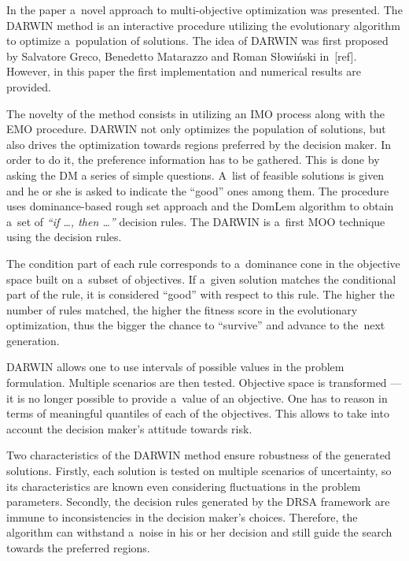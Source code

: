 In the paper a~novel approach to multi-objective optimization was
presented. The DARWIN method is an interactive procedure utilizing the
evolutionary algorithm to optimize a~population of solutions. The idea of
DARWIN was first proposed by Salvatore Greco, Benedetto Matarazzo and Roman
Słowiński in~[ref]. However, in this paper the first implementation and
numerical results are provided.

The novelty of the method consists in utilizing an IMO process along with the
EMO procedure. DARWIN not only optimizes the population of solutions, but also
drives the optimization towards regions preferred by the decision maker. In
order to do it, the preference information has to be gathered. This is done by
asking the DM a series of simple questions. A~list of feasible solutions is
given and he or she is asked to indicate the ``good'' ones among them. The
procedure uses dominance-based rough set approach and the DomLem algorithm to
obtain a~set of \textit{``if \dots, then \dots''} decision rules. The DARWIN
is a~first MOO technique using the decision rules.

The condition part of each rule corresponds to a~dominance cone in the
objective space built on a~subset of objectives. If a~given solution matches
the conditional part of the rule, it is considered ``good'' with respect to
this rule. The higher the number of rules matched, the higher the fitness
score in the evolutionary optimization, thus the bigger the chance to
``survive'' and advance to the~next generation.

DARWIN allows one to use intervals of possible values in the problem
formulation. Multiple scenarios are then tested. Objective space is
transformed --- it is no longer possible to provide a~value of an
objective. One has to reason in terms of meaningful quantiles of each of the
objectives. This allows to take into account the decision maker's attitude
towards risk.

Two characteristics of the DARWIN method ensure robustness of the generated
solutions. Firstly, each solution is tested on multiple scenarios of
uncertainty, so its characteristics are known even considering fluctuations in
the problem parameters. Secondly, the decision rules generated by the DRSA
framework are immune to inconsistencies in the decision maker's
choices. Therefore, the algorithm can withstand a~noise in his or her decision
and still guide the search towards the preferred regions.

